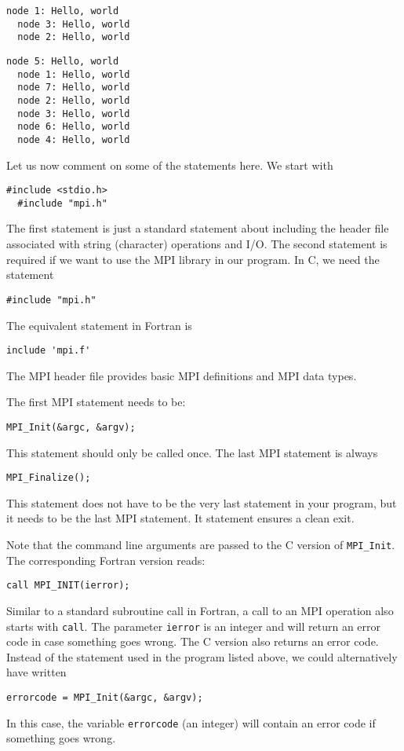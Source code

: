 \begin{lstlisting}[float, caption={Hello world MPI in C: $4$ processors.}, label=lst:mpi-hello-4]
  node 1: Hello, world
  node 3: Hello, world
  node 2: Hello, world
\end{lstlisting}

\begin{lstlisting}[float, caption={Hello world MPI in C: $8$ processors.}, label=lst:mpi-hello-8]
  node 5: Hello, world
  node 1: Hello, world
  node 7: Hello, world
  node 2: Hello, world
  node 3: Hello, world
  node 6: Hello, world
  node 4: Hello, world
\end{lstlisting}

Let us now comment on some of the statements here. We start with
\begin{lstlisting}[style=c]
  #include <stdio.h>
  #include "mpi.h"
\end{lstlisting}
The first statement is just a standard statement about including the header file
associated with string (character) operations and I/O. The second statement is
required if we want to use the MPI library in our program. In C, we need the
statement
\begin{lstlisting}[style=c]
  #include "mpi.h"
\end{lstlisting}
The equivalent statement in Fortran is
\begin{lstlisting}[style=fortran]
  include 'mpi.f'
\end{lstlisting}
The MPI header file provides basic MPI definitions and MPI data types.

The first MPI statement needs to be:
\begin{lstlisting}[style=c]
  MPI_Init(&argc, &argv);
\end{lstlisting}
This statement should only be called once. The last MPI statement is always
\begin{lstlisting}[style=c]
  MPI_Finalize();
\end{lstlisting}
This statement does not have to be the very last statement in your program, but
it needs to be the last MPI statement. It statement ensures a clean exit.

Note that the command line arguments are passed to the C version of
\texttt{MPI\_Init}. The corresponding Fortran version reads:
\begin{lstlisting}[style=fortran]
  call MPI_INIT(ierror);
\end{lstlisting}
Similar to a standard subroutine call in Fortran, a call to an MPI operation
also starts with \texttt{call}. The parameter \texttt{ierror} is an integer and
will return an error code in case something goes wrong. The C version also
returns an error code. Instead of the statement used in the program listed
above, we could alternatively have written
\begin{lstlisting}[style=c]
  errorcode = MPI_Init(&argc, &argv);
\end{lstlisting}
In this case, the variable \texttt{errorcode} (an integer) will contain an error
code if something goes wrong.

